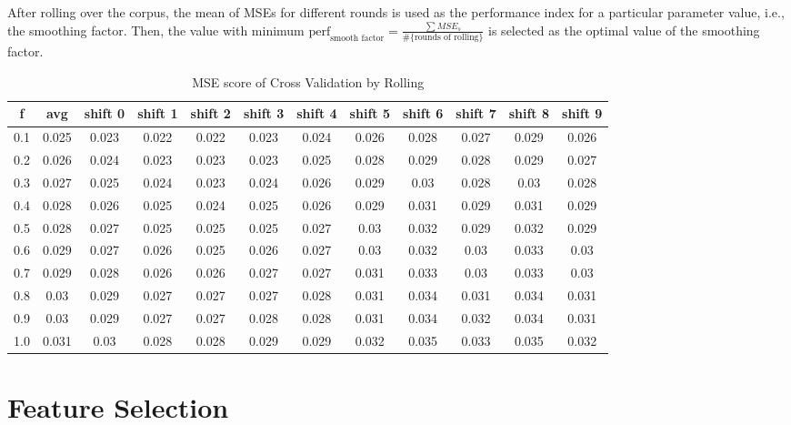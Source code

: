 \documentclass{article}
\begin{document}
After rolling over the corpus, the mean of MSEs for different rounds is used as the performance index for a particular parameter value, i.e., the smoothing factor. Then, the value with minimum $\text{perf}_{\text{smooth factor}} = \frac{\sum{MSE_s}}{\#\{\text{rounds of rolling}\}} $ is selected as the optimal value of the smoothing factor.

\begin{table}[!ht]
	\centering
	\begin{tabular}{ |c|c|c|c|c|c|c|c|c|c|c|c| }
		\hline
		\textbf{f} & \textbf{avg} & shift 0 & shift 1& shift 2& shift 3& shift 4& shift 5& shift 6& shift 7& shift 8& shift 9 \\
		\hline

0.1 & 0.025 & 0.023 & 0.022 & 0.022 & 0.023 & 0.024 & 0.026 & 0.028 & 0.027 & 0.029 & 0.026 \\
\hline
0.2 & 0.026 & 0.024 & 0.023 & 0.023 & 0.023 & 0.025 & 0.028 & 0.029 & 0.028 & 0.029 & 0.027 \\
\hline
0.3 & 0.027 & 0.025 & 0.024 & 0.023 & 0.024 & 0.026 & 0.029 & 0.03 & 0.028 & 0.03 & 0.028 \\
\hline
0.4 & 0.028 & 0.026 & 0.025 & 0.024 & 0.025 & 0.026 & 0.029 & 0.031 & 0.029 & 0.031 & 0.029 \\
\hline
0.5 & 0.028 & 0.027 & 0.025 & 0.025 & 0.025 & 0.027 & 0.03 & 0.032 & 0.029 & 0.032 & 0.029 \\
\hline
0.6 & 0.029 & 0.027 & 0.026 & 0.025 & 0.026 & 0.027 & 0.03 & 0.032 & 0.03 & 0.033 & 0.03 \\
\hline
0.7 & 0.029 & 0.028 & 0.026 & 0.026 & 0.027 & 0.027 & 0.031 & 0.033 & 0.03 & 0.033 & 0.03 \\
\hline
0.8 & 0.03 & 0.029 & 0.027 & 0.027 & 0.027 & 0.028 & 0.031 & 0.034 & 0.031 & 0.034 & 0.031 \\
\hline
0.9 & 0.03 & 0.029 & 0.027 & 0.027 & 0.028 & 0.028 & 0.031 & 0.034 & 0.032 & 0.034 & 0.031 \\
\hline
1.0 & 0.031 & 0.03 & 0.028 & 0.028 & 0.029 & 0.029 & 0.032 & 0.035 & 0.033 & 0.035 & 0.032 \\
\hline

\end{tabular}
\caption{MSE score of Cross Validation by Rolling}
\label{table:result-cv}
\end{table}

\section{Feature Selection}
\end{document}

